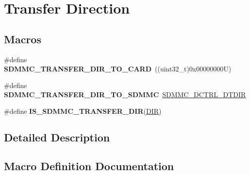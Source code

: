 \hypertarget{group___s_d_m_m_c___l_l___transfer___direction}{}\section{Transfer Direction}
\label{group___s_d_m_m_c___l_l___transfer___direction}
\subsection*{Macros}
\begin{DoxyCompactItemize}
\item 
\mbox{\label{group___s_d_m_m_c___l_l___transfer___direction_ga24c27a336152cd638335755e3b32465e}} 
\#define {\bfseries S\+D\+M\+M\+C\+\_\+\+T\+R\+A\+N\+S\+F\+E\+R\+\_\+\+D\+I\+R\+\_\+\+T\+O\+\_\+\+C\+A\+RD}~((uint32\+\_\+t)0x00000000\+U)
\item 
\mbox{\label{group___s_d_m_m_c___l_l___transfer___direction_ga12a44f19f1f4320b80e0cfad52cc1c24}} 
\#define {\bfseries S\+D\+M\+M\+C\+\_\+\+T\+R\+A\+N\+S\+F\+E\+R\+\_\+\+D\+I\+R\+\_\+\+T\+O\+\_\+\+S\+D\+M\+MC}~\mbox{\hyperlink{group___peripheral___registers___bits___definition_gaa92ab89c4db40d4cec9f0f1e26c5f27d}{S\+D\+M\+M\+C\+\_\+\+D\+C\+T\+R\+L\+\_\+\+D\+T\+D\+IR}}
\item 
\#define {\bfseries I\+S\+\_\+\+S\+D\+M\+M\+C\+\_\+\+T\+R\+A\+N\+S\+F\+E\+R\+\_\+\+D\+IR}(\mbox{\hyperlink{struct_d_i_r}{D\+IR}})
\end{DoxyCompactItemize}


\subsection{Detailed Description}


\subsection{Macro Definition Documentation}
\mbox{\label{group___s_d_m_m_c___l_l___transfer___direction_ga584aab4961afb449ecf9bd22ba4d10c6}} 
